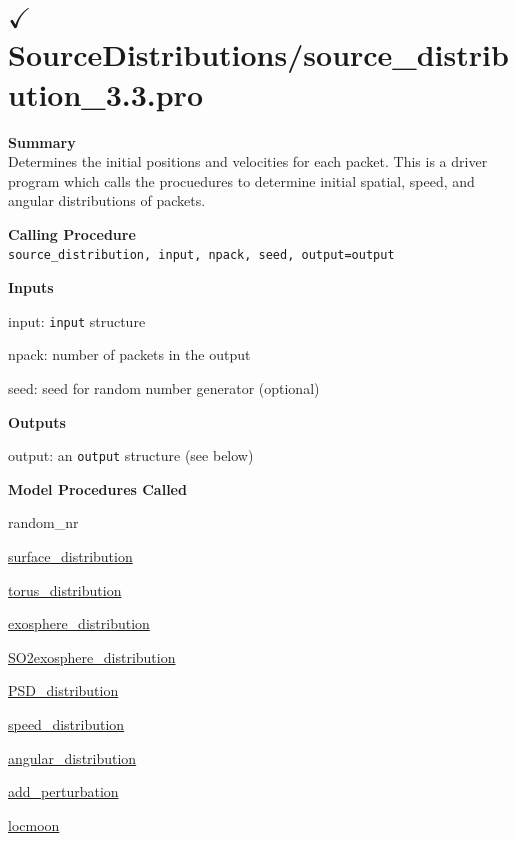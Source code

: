 \documentclass[11pt]{article}
\newcommand\descrip[1]{\textsf{\textbf{\large{#1}}}\\}
\begin{document}
\section{$\checkmark$SourceDistributions/source\_distribution\_3.3.pro}
\label{sec:source_distribution}

\descrip{Summary}
Determines the initial positions and velocities for each packet. This is a
driver program which calls the procuedures to determine initial spatial, speed,
and angular distributions of packets.

\descrip{Calling Procedure}
\verb+source_distribution, input, npack, seed, output=output+

\descrip{Inputs}
\begin{compactenum} \listup
\item input: \texttt{input} structure
\item npack: number of packets in the output
\item seed: seed for random number generator (optional)
\end{compactenum}

\descrip{Outputs}
\begin{compactenum} \listup
\item output: an \texttt{output} structure (see below)
\end{compactenum}

\descrip{Model Procedures Called}
\begin{compactenum} \listup
\item random\_nr
\item \hyperref[sec:surface_distribution]{surface\_distribution}
\item \hyperref[sec:torus_distribution]{torus\_distribution}
\item \hyperref[sec:exosphere_distribution]{exosphere\_distribution}
\item \hyperref[sec:SO2exosphere_distribution]{SO2exosphere\_distribution}
\item \hyperref[sec:PSD_distribution]{PSD\_distribution}
\item \hyperref[sec:speed_distribution]{speed\_distribution}
\item \hyperref[sec:angular_distribution]{angular\_distribution}
\item \hyperref[sec:add_perturbation]{add\_perturbation}
\item \hyperref[sec:locmoon]{locmoon}
\end{compactenum}
\end{document}
